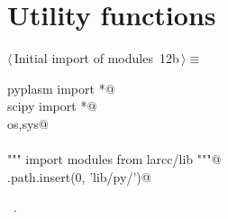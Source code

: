 \documentclass[11pt,oneside]{article}	%
\begin{document}
\appendix
\section{Utility functions}

\begin{flushleft} \small
\begin{minipage}{\linewidth} \label{scrap36}
\protect{}$\langle\,$Initial import of modules\nobreak\ {\footnotesize 12b}$\,\rangle\equiv$
\vspace{-1ex}
\begin{list}{}{} \item
\mbox{}\verb@from pyplasm import *@\\
\mbox{}\verb@from scipy import *@\\
\mbox{}\verb@import os,sys@\\
\mbox{}\verb@@\\
\mbox{}\verb@""" import modules from larcc/lib """@\\
\mbox{}\verb@sys.path.insert(0, 'lib/py/')@\\
\mbox{}\verb@@{\NWsep}
\end{list}
\vspace{-1ex}
\footnotesize\addtolength{\baselineskip}{-1ex}
\begin{list}{}{\setlength{\itemsep}{-\parsep}\setlength{\itemindent}{-\leftmargin}}
\item \NWtxtMacroRefIn\ .
\end{list}
\end{minipage}\\[4ex]
\end{flushleft}
\end{document}
